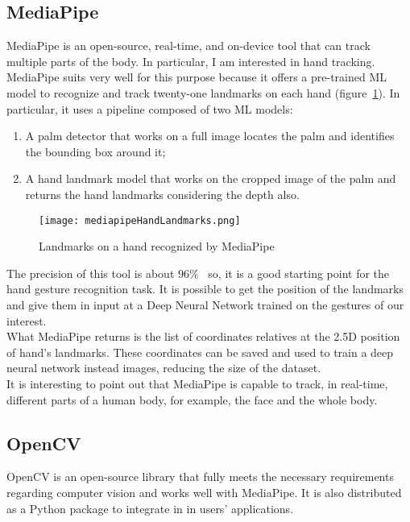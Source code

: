 \documentclass[../thesis.tex]{subfiles}
\begin{document}
\subsection{MediaPipe}\label{sec:mediapipe}
MediaPipe is an open-source, real-time, and on-device tool that can track multiple parts of the body. In particular, I am interested in hand tracking. MediaPipe suits very well for this purpose because it offers a pre-trained \acrshort{ML} model to recognize and track twenty-one landmarks on each hand (figure~\ref{fig:landmarksMediapipe}). In particular, it uses a pipeline composed of two \acrshort{ML} models:
\begin{enumerate}
    \item A palm detector that works on a full image locates the palm and identifies the bounding box around it;
    \item A hand landmark model that works on the cropped image of the palm and returns the hand landmarks considering the depth also. 
\end{enumerate}
\begin{figure}[H]
    \centering
    \texttt{[image: mediapipeHandLandmarks.png]}
    \caption{Landmarks on a hand recognized by MediaPipe~\cite{site:mediapipe}}
    \label{fig:landmarksMediapipe}
\end{figure}
The precision of this tool is about $96\%$~\cite{paper:mediapipe} so, it is a good starting point for the hand gesture recognition task. It is possible to get the position of the landmarks and give them in input at a Deep Neural Network trained on the gestures of our interest.\\
What MediaPipe returns is the list of coordinates relatives at the 2.5D position of hand's landmarks. These coordinates can be saved and used to train a deep neural network instead images, reducing the size of the dataset.\\
It is interesting to point out that MediaPipe is capable to track, in real-time, different parts of a human body, for example, the face and the whole body.~\cite{site:mediapipe}

\subsection{OpenCV}
OpenCV is an open-source library that fully meets the necessary requirements regarding computer vision and works well with MediaPipe. It is also distributed as a Python package to integrate in in users' applications.
\end{document}
